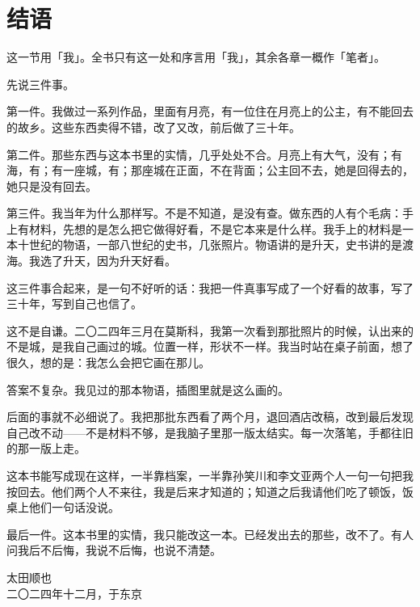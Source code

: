 
\chapter*{结\quad 语}
{}

\noindent
这一节用「我」。全书只有这一处和序言用「我」，其余各章一概作「笔者」。

先说三件事。

第一件。我做过一系列作品，里面有月亮，有一位住在月亮上的公主，有不能回去的故乡。这些东西卖得不错，改了又改，前后做了三十年。

第二件。那些东西与这本书里的实情，几乎处处不合。月亮上有大气，没有；有海，有；有一座城，有；那座城在正面，不在背面；公主回不去，她是回得去的，她只是没有回去。

第三件。我当年为什么那样写。不是不知道，是没有查。做东西的人有个毛病：手上有材料，先想的是怎么把它做得好看，不是它本来是什么样。我手上的材料是一本十世纪的物语，一部八世纪的史书，几张照片。物语讲的是升天，史书讲的是渡海。我选了升天，因为升天好看。

这三件事合起来，是一句不好听的话：我把一件真事写成了一个好看的故事，写了三十年，写到自己也信了。

这不是自谦。二〇二四年三月在莫斯科，我第一次看到那批照片的时候，认出来的不是城，是我自己画过的城。位置一样，形状不一样。我当时站在桌子前面，想了很久，想的是：我怎么会把它画在那儿。

答案不复杂。我见过的那本物语，插图里就是这么画的。

后面的事就不必细说了。我把那批东西看了两个月，退回酒店改稿，改到最后发现自己改不动——不是材料不够，是我脑子里那一版太结实。每一次落笔，手都往旧的那一版上走。

这本书能写成现在这样，一半靠档案，一半靠孙笑川和李文亚两个人一句一句把我按回去。他们两个人不来往，我是后来才知道的；知道之后我请他们吃了顿饭，饭桌上他们一句话没说。

最后一件。这本书里的实情，我只能改这一本。已经发出去的那些，改不了。有人问我后不后悔，我说不后悔，也说不清楚。

\begin{flushright}
{\small 太田顺也}\\[2mm]
{\footnotesize\color{pencil} 二〇二四年十二月，于东京}
\end{flushright}

\clearpage

